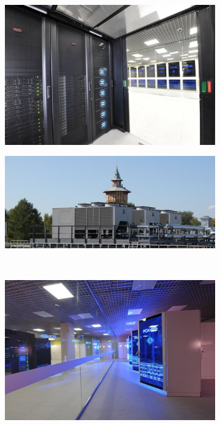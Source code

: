 \begin{refsection}
\begin{figure}[ht]
	\begin{subfigure}[t]{\dimexpr.5\linewidth-1.3em\relax}
		\centering
		\includegraphics[width=.95\linewidth,valign=t]{my_folder/images/spbpu_sc_system}
	\end{subfigure}
\hfill %
	\begin{subfigure}[t]{\dimexpr.5\linewidth-1.3em\relax}
		\centering
		\includegraphics[width=.95\linewidth,valign=t]{my_folder/images/spbpu_sc_refr}
	\end{subfigure}
\\[20pt]
\begin{subfigure}[t]{\dimexpr.5\linewidth-1.3em\relax}
	\centering
	\includegraphics[width=.95\linewidth,valign=t]{my_folder/images/spbpu_sc_hall}

\end{subfigure}
\end{figure}
\end{refsection}
